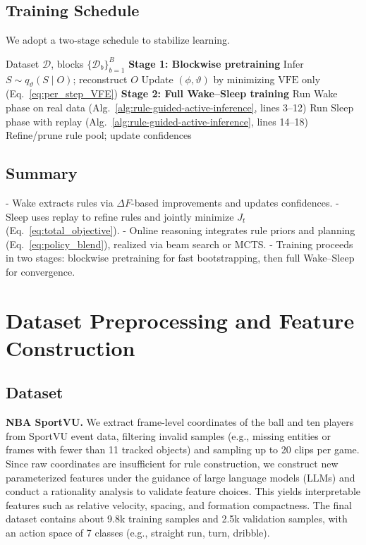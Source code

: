 \documentclass{article} %
\begin{document}
\subsection{Training Schedule}
We adopt a two-stage schedule to stabilize learning.  
\begin{algorithm}[ht]
\caption{Two-Stage Training: Blockwise Pretraining and Full Wake–Sleep}
\label{alg:training-schedule}
\begin{algorithmic}[1]
\Require Dataset $\mathcal D$, blocks $\{\mathcal D_b\}_{b=1}^B$
\State \textbf{Stage 1: Blockwise pretraining}
    \State Infer $S\sim q_{\vartheta}(S\mid O)$; reconstruct $O$
    \State Update $(\phi,\vartheta)$ by minimizing $\mathrm{VFE}$ only (Eq.~\ref{eq:per_step_VFE})
  \EndFor
\EndFor
\State \textbf{Stage 2: Full Wake–Sleep training}
  \State Run Wake phase on real data (Alg.~\ref{alg:rule-guided-active-inference}, lines 3--12)
  \State Run Sleep phase with replay (Alg.~\ref{alg:rule-guided-active-inference}, lines 14--18)
  \State Refine/prune rule pool; update confidences
\EndFor
\end{algorithmic}
\end{algorithm}

\subsection{Summary}
- Wake extracts rules via $\Delta F$-based improvements and updates confidences.  
- Sleep uses replay to refine rules and jointly minimize $J_t$ (Eq.~\ref{eq:total_objective}).  
- Online reasoning integrates rule priors and planning (Eq.~\ref{eq:policy_blend}), realized via beam search or MCTS.  
- Training proceeds in two stages: blockwise pretraining for fast bootstrapping, then full Wake–Sleep for convergence.

\section{Dataset Preprocessing and Feature Construction}
\label{Sec:B}

\subsection{Dataset}
\label{Sec:B1}

\textbf{NBA SportVU.}
We extract frame-level coordinates of the ball and ten players from SportVU event data,
filtering invalid samples (e.g., missing entities or frames with fewer than 11 tracked objects)
and sampling up to 20 clips per game. Since raw coordinates are insufficient for rule
construction, we construct new parameterized features under the guidance of large language
models (LLMs) and conduct a rationality analysis to validate feature choices. This yields
interpretable features such as relative velocity, spacing, and formation compactness.
The final dataset contains about 9.8k training samples and 2.5k validation samples, with
an action space of 7 classes (e.g., straight run, turn, dribble).
\end{document}
